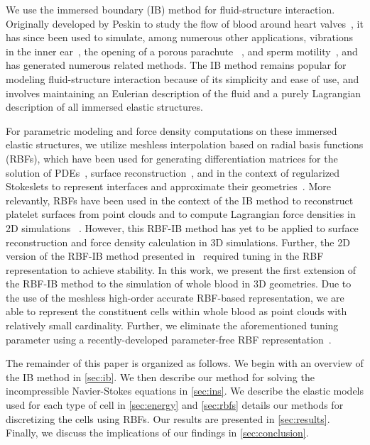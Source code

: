 We use the immersed boundary (IB) method for fluid-structure interaction. Originally developed by Peskin to study
the flow of blood around heart valves~\cite{Peskin:1972wa}, it has since been used to simulate, among numerous
other applications, vibrations in the inner ear~\cite{BeyerJr:1990tb}, the opening of a porous parachute~%
\cite{Kim:2006ku}, and sperm motility~\cite{Dillon:2011cu}, and has generated numerous related methods. The IB
method remains popular for modeling fluid-structure interaction because of its simplicity and ease of use, and
involves maintaining an Eulerian description of the fluid and a purely Lagrangian description of all immersed
elastic structures.

For parametric modeling and force density computations on these immersed elastic structures, we utilize meshless
interpolation based on radial basis functions (RBFs), which have been used for generating differentiation matrices
for the solution of PDEs~\cite{Fasshauer:2007ui}, surface reconstruction~\cite{Hardy:1971tb, Carr:2001tb,
Shankar:2013ki, SFKSISC2018}, and in the context of regularized Stokeslets to represent interfaces and approximate
their geometries~\cite{Olson:2015ja}. More relevantly, RBFs have been used in the context of the IB method to
reconstruct platelet surfaces from point clouds and to compute Lagrangian force densities in 2D simulations~%
\cite{Shankar:2015km}. However, this RBF-IB method has yet to be applied to surface reconstruction and force
density calculation in 3D simulations. Further, the 2D version of the RBF-IB method presented in~%
\cite{Shankar:2015km} required tuning in the RBF representation to achieve stability. In this work, we present the
first extension of the RBF-IB method to the simulation of whole blood in 3D geometries. Due to the use of the
meshless high-order accurate RBF-based representation, we are able to represent the constituent cells within whole
blood as point clouds with relatively small cardinality.  Further, we eliminate the aforementioned tuning
parameter using a recently-developed parameter-free RBF representation~\cite{SFKSISC2018}.

The remainder of this paper is organized as follows. We begin with an overview of the IB method in \cref{sec:ib}.
We then describe our method for solving the incompressible Navier-Stokes equations in \cref{sec:ins}. We describe
the elastic models used for each type of cell in \cref{sec:energy} and \cref{sec:rbfs} details our methods for
discretizing the cells using RBFs. Our results are presented in \cref{sec:results}.  Finally, we discuss the
implications of our findings in \cref{sec:conclusion}.
